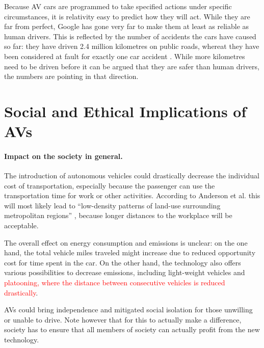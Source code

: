 \documentclass[11pt]{article}
\newcommand{\changed}[1]{\textcolor{red}{#1}}
\begin{document}
Because AV cars are programmed to take specified actions under specific circumstances, it is relativity easy to predict how they will act. While they are far from perfect, Google has gone very far to make them at least as reliable as human drivers. This is reflected by the number of accidents the cars have caused so far: they have driven 2.4 million kilometres on public roads, whereat they have been considered at fault for exactly one car accident \cite{chrisurmson2016}. While more kilometres need to be driven before it can be argued that they are safer than human drivers, the numbers are pointing in that direction. 

\section{Social and Ethical Implications of AVs}
\paragraph{Impact on the society in general.}
The introduction of autonomous vehicles could drastically decrease the individual cost of transportation, especially because the passenger can use the transportation time for work or other activities. According to Anderson et al. this will most likely lead to ``low-density patterns of land-use surrounding metropolitan regions'' \cite{Anderson2014rand}, because longer distances to the workplace will be acceptable.

The overall effect on energy consumption and emissions is unclear: on the one hand, the total vehicle miles traveled might increase due to reduced opportunity cost for time spent in the car. On the other hand, the technology also offers various possibilities to decrease emissions, including light-weight vehicles and \changed{platooning, where the distance between consecutive vehicles is reduced drastically}.

AVs could bring independence and mitigated social isolation for those unwilling or unable to drive. Note however that for this to actually make a difference, society has to ensure that all members of society can actually profit from the new technology.
\end{document}
